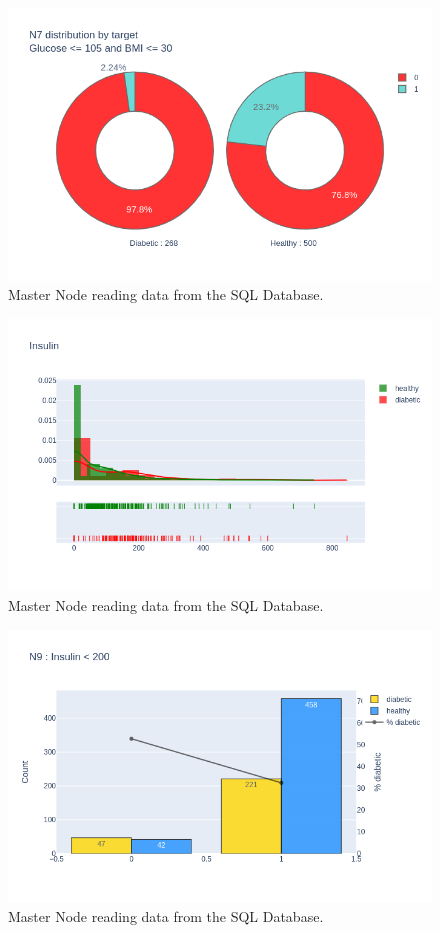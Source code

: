 \documentclass[12pt]{article}
\begin{document}
\begin{figure}[ht]
\centering
\includegraphics[width=1\textwidth]{newplot(30).png}
\caption{Master Node reading data from the SQL Database.}
\end{figure}

\begin{figure}[ht]
\centering
\includegraphics[width=1\textwidth]{newplot(31).png}
\caption{Master Node reading data from the SQL Database.}
\end{figure}

\begin{figure}[ht]
\centering
\includegraphics[width=1\textwidth]{newplot(32).png}
\caption{Master Node reading data from the SQL Database.}
\end{figure}
\end{document}

